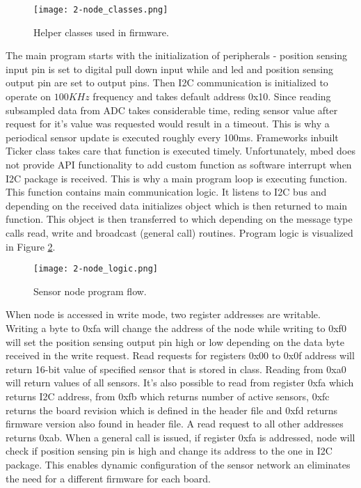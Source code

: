 \begin{figure}[h]
  \begin{center}
    \texttt{[image: 2-node\_classes.png]}
  \end{center}
  \caption{Helper classes used in firmware.}
  \label{fig:node_classes}
\end{figure}

The main program starts with the initialization of peripherals - position sensing input pin is set to digital pull down input while and led and position sensing output pin are set to output pins. Then I2C communication is initialized to operate on $100KHz$ frequency and takes default address 0x10. Since reading subsampled data from \ac{ADC} takes considerable time, reding sensor value after request for it's value was requested would result in a timeout. This is why a periodical sensor update is executed roughly every 100ms. Frameworks inbuilt Ticker class takes care that function  is executed timely. Unfortunately, mbed does not provide \ac{API} functionality to add custom function as software interrupt when I2C package is received. This is why a main program loop is executing  function. This function contains main communication logic. It listens to I2C bus and depending on the received data initializes  object which is then returned to main function. This object is then transferred to  which depending on the message type calls read, write and broadcast (general call) routines. Program logic is visualized in Figure \ref{fig:node_logic}.

\begin{figure}[h]
  \begin{center}
    \texttt{[image: 2-node\_logic.png]}
  \end{center}
  \caption{Sensor node program flow.}
  \label{fig:node_logic}
\end{figure}

When node is accessed in write mode, two register addresses are writable. Writing a byte to 0xfa will change the address of the node while writing to 0xf0 will set the position sensing output pin high or low depending on the data byte received in the write request. Read requests for registers 0x00 to 0x0f address will return 16-bit value of specified sensor that is stored in  class. Reading from 0xa0 will return values of all sensors. It's also possible to read from register 0xfa which returns I2C address, from 0xfb which returns number of active sensors, 0xfc returns the board revision which is defined in the header file and 0xfd returns firmware version also found in header file. A read request to all other addresses returns 0xab. When a general call is issued, if register 0xfa is addressed, node will check if position sensing pin is high and change its address to the one in \ac{I2C} package. This enables dynamic configuration of the sensor network an eliminates the need for a different firmware for each board. \\

